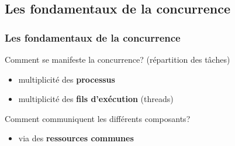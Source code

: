 \documentclass{beamer}
\begin{document}
\subsection{Les fondamentaux de la concurrence}
\begin{frame}
  \frametitle{Les fondamentaux de la concurrence}
  Comment se manifeste la concurrence? (répartition des tâches)
  \begin{itemize}
  \item multiplicité des \textbf{processus}
  \item multiplicité des \textbf{fils d'exécution} (threads)
  \end{itemize}
\par\bigskip
  Comment communiquent les différents composants?
  \begin{itemize}
  \item via des \textbf{ressources communes}
  \end{itemize}
\end{frame} %
\end{document}
